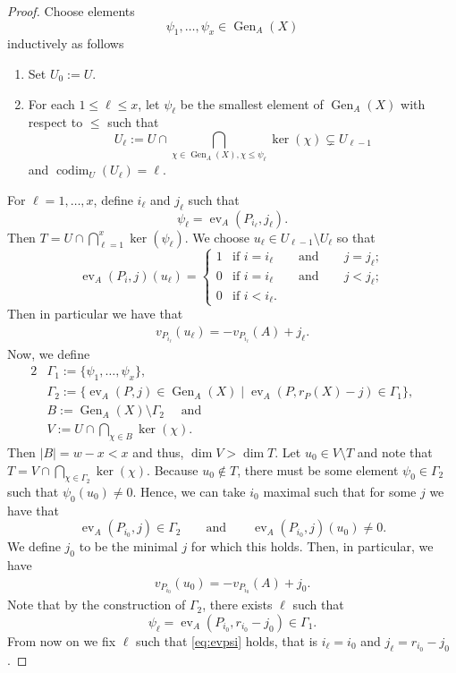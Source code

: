 \documentclass[12pt]{amsart}
\renewcommand{\leq}{\leqslant}
\DeclareMathOperator{\ev}{ev}
\DeclareMathOperator{\Gen}{Gen}
\theoremstyle{definition}
\begin{document}
\begin{proof}
		Choose elements 
		$$\psi_1, \ldots , \psi_x \in \Gen_A(X)  $$
		inductively as follows
		\begin{enumerate}[1.]
			\item Set $U_0:=U$.
			\item For each $1\le \ell \le x$, let $\psi_\ell$ be the smallest element of $\Gen_A(X)$ with respect to $\leq$ such that
			$$
			U_\ell:=U \cap\bigcap_{\chi\in\Gen_A(X), \chi\le \psi_\ell }\ker(\chi)
			\subsetneq U_{\ell-1}
			$$
			and $\operatorname{codim}_U(U_\ell )=\ell$.
		\end{enumerate}
		For $\ell = 1, \ldots, x$, define $i_\ell$ and $j_\ell$ such that
		$$\psi_{\ell}=\ev_{A}(P_{i_\ell},j_\ell).$$
		Then $T = U \cap \bigcap_{\ell = 1}^x \ker(\psi_\ell)$.
		We choose $u_\ell \in U_{\ell-1} \setminus U_\ell $ so that 
		\begin{equation} \label{eq:ul}
			\ev_A(P_i,j)(u_\ell) =\begin{cases}
				1&\text{if } i=i_\ell \qquad \text{and} \qquad j=j_\ell;\\
				0&\text{if } i= i_\ell \qquad\text{and}\qquad  j< j_\ell;\\
				0&\text{if } i< i_\ell.
			\end{cases}
		\end{equation} 
		Then in particular we have that
		\begin{align}
			v_{P_{i_\ell} } (u_\ell) =-v_{P_{i_\ell}} (A) +j_\ell .
			\label{eq:s_u}
		\end{align}
		Now, we define 
		\begin{alignat*}{2}
			& \Gamma_1 := \{\psi_1, \ldots, \psi_x\}, &&\\
			&\Gamma_2:=\{\ev_A( P, j) \in \Gen_A(X) \mid \ev_A (P,r_P(X) - j)\in \Gamma_1\}, &&\\
			& B:= \Gen_A(X) \setminus \Gamma_2 \quad \text{ and }&&\\
			& V := U \cap \bigcap_{\chi\in B}\ker(\chi). &&
		\end{alignat*}
		Then $|B|=w-x<x $ and thus, $\dim V >\dim T.$ Let $u_0 \in V\setminus T$ and note that $T = V \cap \bigcap_{\chi \in \Gamma_2} \ker(\chi)$. Because $u_0\notin T$, there must be some element $\psi_0 \in \Gamma_2$ such that $\psi_0(u_0) \neq 0$. Hence, we can take $i_0$ maximal such that for some $j$ we have that
		$$\ev_A(P_{i_0},j )\in \Gamma_2 \qquad\text{and}\qquad \ev_A(P_{i_0},j)(u_0)\neq 0.$$
		We define $j_0$ to be the minimal $j$ for which this holds. Then, in particular, we have 
		\begin{align}
			v_{P_{ i_0} } (u_0)  = -v_{P_{i_0}}(A) +j_0    \label{eq:d}.
		\end{align}
		Note that by the construction of $\Gamma_2$, there exists $\ell$ such that 
		\begin{equation}\label{eq:evpsi} \psi_\ell=\ev_{A}(P_{i_0},r_{i_0}-j_0) \in \Gamma_1.
		\end{equation}
		From now on we fix $\ell$ such that \eqref{eq:evpsi} holds, that is $i_\ell = i_0$ and $j_\ell = r_{i_0} - j_0$. 
		

\end{proof}
\end{document}
